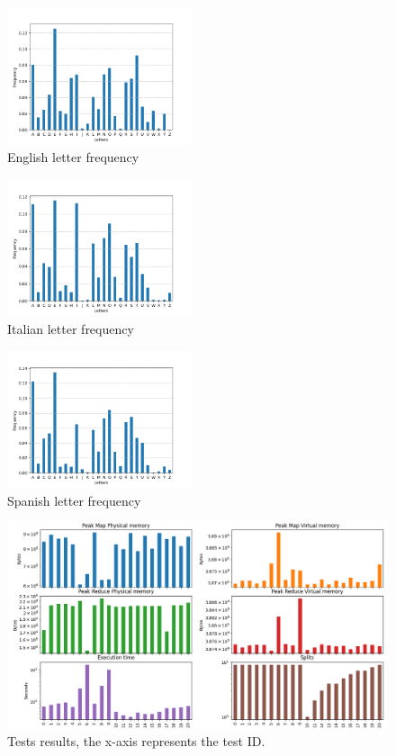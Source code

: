 \documentclass{article}
\begin{document}
\begin{multicols}{2}
\begin{figure}[H]
    \centering
    \includegraphics[width=0.48\textwidth]{figures/en.png}
    \caption{English letter frequency}
    \label{fig:en_freq}
\end{figure}
\begin{figure}[H]
    \centering
    \includegraphics[width=0.48\textwidth]{figures/it.png}
    \caption{Italian letter frequency}
    \label{fig:it_freq}
\end{figure}
\begin{figure}[H]
    \centering
    \includegraphics[width=0.48\textwidth]{figures/es.png}
    \caption{Spanish letter frequency}
    \label{fig:es_freq}
\end{figure}



\end{multicols}
\begin{figure}[H]
    \centering
    \includegraphics[width=1\textwidth]{figures/experiments.png}
    \caption{Tests results, the x-axis represents the test ID.}
    \label{fig:tests_graph}
\end{figure}
\end{document}
